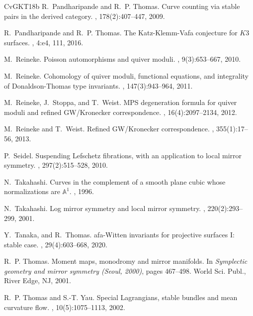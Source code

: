 \documentclass[11pt,letterpaper]{amsart}
\begin{document}
\begin{thebibliography}{CvGKT18b}
R.~Pandharipande and R.~P. Thomas.
\newblock Curve counting via stable pairs in the derived category.
, 178(2):407--447, 2009.

R.~Pandharipande and R.~P. Thomas.
\newblock The {K}atz-{K}lemm-{V}afa conjecture for {$K3$} surfaces.
, 4:e4, 111, 2016.

M.~Reineke.
\newblock Poisson automorphisms and quiver moduli.
, 9(3):653--667, 2010.

M.~Reineke.
\newblock Cohomology of quiver moduli, functional equations, and integrality of
  {D}onaldson-{T}homas type invariants.
, 147(3):943--964, 2011.

M.~Reineke, J.~Stoppa, and T.~Weist.
\newblock M{PS} degeneration formula for quiver moduli and refined
  {GW}/{K}ronecker correspondence.
, 16(4):2097--2134, 2012.

M.~Reineke and T.~Weist.
\newblock Refined {GW}/{K}ronecker correspondence.
, 355(1):17--56, 2013.

P.~Seidel.
\newblock Suspending {L}efschetz fibrations, with an application to local
  mirror symmetry.
, 297(2):515--528, 2010.

N.~Takahashi.
\newblock Curves in the complement of a smooth plane cubic whose normalizations
  are $\mathbb{A}^1$.
, 1996.

N.~Takahashi.
\newblock Log mirror symmetry and local mirror symmetry.
, 220(2):293--299, 2001.

Y.~Tanaka, and R.~Thomas.
afa-{W}itten invariants for projective surfaces {I}: stable case.
, 29(4):603--668, 2020.


R.~P. Thomas.
\newblock Moment maps, monodromy and mirror manifolds.
\newblock In {\em Symplectic geometry and mirror symmetry ({S}eoul, 2000)},
  pages 467--498. World Sci. Publ., River Edge, NJ, 2001.
  
R.~P. Thomas and S.-T. Yau.
\newblock Special {L}agrangians, stable bundles and mean curvature flow.
, 10(5):1075--1113, 2002.


\end{thebibliography}
\end{document}

